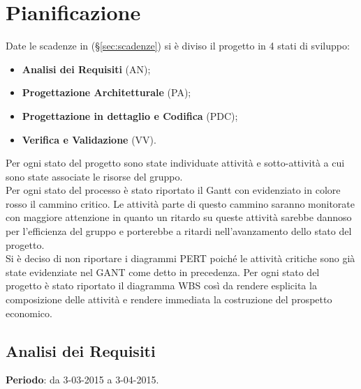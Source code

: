 \section{Pianificazione}{
	Date le scadenze in (\S \ref{sec:scadenze}) si è diviso il progetto in 4 stati di sviluppo:
	\begin{itemize}
		\item \textbf{Analisi dei Requisiti} (AN);
		\item \textbf{Progettazione Architetturale} (PA);
		\item \textbf{Progettazione in dettaglio e Codifica} (PDC);
		\item \textbf{Verifica e Validazione} (VV).
	\end{itemize}
	
	Per ogni stato del progetto sono state individuate attività e sotto-attività a cui sono state associate le risorse del gruppo.\\
	Per ogni stato del processo è stato riportato il Gantt con evidenziato in colore rosso il cammino critico. Le attività parte di questo cammino saranno monitorate con maggiore attenzione in quanto un ritardo su queste attività	sarebbe dannoso per l'efficienza del gruppo e porterebbe a ritardi nell'avanzamento dello stato del progetto.\\
	Si è deciso di non riportare i diagrammi PERT poiché le attività critiche sono già state evidenziate nel GANT come detto in precedenza.
	Per ogni stato del progetto è stato riportato il diagramma WBS così da rendere esplicita la composizione delle attività e rendere immediata la costruzione del prospetto economico.
	
\newpage
\subsection{Analisi dei Requisiti}{
	\textbf{Periodo}: da 3-03-2015 a 3-04-2015. \\
	
}}
